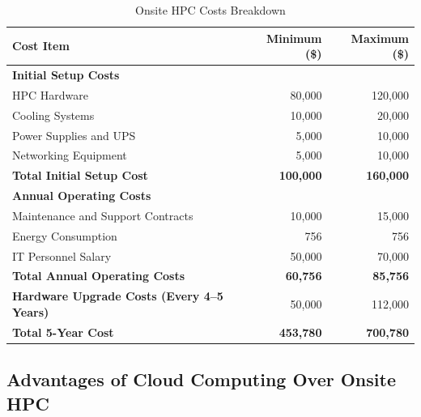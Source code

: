 \documentclass{article}
\begin{document}
\begin{table}[H]
    \centering
    \caption{Onsite HPC Costs Breakdown}
    \label{tab:hpc_costs}
    \begin{tabular}{lrr}
    \toprule
    \textbf{Cost Item} & \textbf{Minimum (\$)} & \textbf{Maximum (\$)} \\
    \midrule
    \textbf{Initial Setup Costs} & & \\
    \quad HPC Hardware & 80,000 & 120,000 \\
    \quad Cooling Systems & 10,000 & 20,000 \\
    \quad Power Supplies and UPS & 5,000 & 10,000 \\
    \quad Networking Equipment & 5,000 & 10,000 \\
    \textbf{Total Initial Setup Cost} & \textbf{100,000} & \textbf{160,000} \\
    \midrule
    \textbf{Annual Operating Costs} & & \\
    \quad Maintenance and Support Contracts & 10,000 & 15,000 \\
    \quad Energy Consumption & 756 & 756 \\
    \quad IT Personnel Salary & 50,000 & 70,000 \\
    \textbf{Total Annual Operating Costs} & \textbf{60,756} & \textbf{85,756} \\
    \midrule
    \textbf{Hardware Upgrade Costs (Every 4--5 Years)} & 50,000 & 112,000 \\
    \midrule
    \textbf{Total 5-Year Cost} & \textbf{453,780} & \textbf{700,780} \\
    \bottomrule
    \end{tabular}
    \end{table}

\subsection{Advantages of Cloud Computing Over Onsite HPC}
\end{document}
